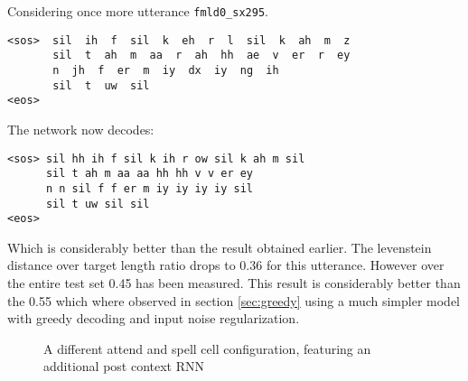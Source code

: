 \newpage
Considering once more utterance \texttt{fmld0\_sx295}.
\begin{lstlisting}[caption={Targets}]
<sos>  sil  ih  f  sil  k  eh  r  l  sil  k  ah  m  z
       sil  t  ah  m  aa  r  ah  hh  ae  v  er  r  ey
       n  jh  f  er  m  iy  dx  iy  ng  ih  
       sil  t  uw  sil
<eos>
\end{lstlisting}
The network now decodes:
\begin{lstlisting}[caption={Network output}]
<sos> sil hh ih f sil k ih r ow sil k ah m sil 
	  sil t ah m aa aa hh hh v v er ey 
	  n n sil f f er m iy iy iy iy sil
	  sil t uw sil sil
<eos>
\end{lstlisting}
Which is considerably better than the result obtained earlier. The levenstein distance over target length ratio drops to 0.36 for this utterance. However over the entire test set 0.45 has been measured. This result is considerably better than the 0.55 which where observed in section \ref{sec:greedy} using a much simpler model with greedy decoding and input noise regularization.  

\begin{figure}
\centering

\caption{A different attend and spell cell configuration, featuring an additional post context RNN}
\label{fig:lasVariants}
\end{figure}
